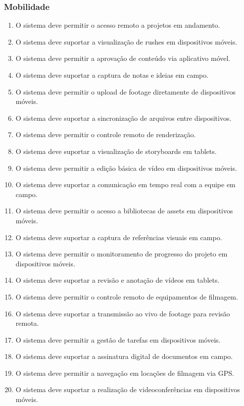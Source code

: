 \subsubsection{Mobilidade}
\begin{enumerate}
  \item O sistema deve permitir o acesso remoto a projetos em andamento.
  \item O sistema deve suportar a visualização de rushes em dispositivos móveis.
  \item O sistema deve permitir a aprovação de conteúdo via aplicativo móvel.
  \item O sistema deve suportar a captura de notas e ideias em campo.
  \item O sistema deve permitir o upload de footage diretamente de dispositivos móveis.
  \item O sistema deve suportar a sincronização de arquivos entre dispositivos.
  \item O sistema deve permitir o controle remoto de renderização.
  \item O sistema deve suportar a visualização de storyboards em tablets.
  \item O sistema deve permitir a edição básica de vídeo em dispositivos móveis.
  \item O sistema deve suportar a comunicação em tempo real com a equipe em campo.
  \item O sistema deve permitir o acesso a bibliotecas de assets em dispositivos móveis.
  \item O sistema deve suportar a captura de referências visuais em campo.
  \item O sistema deve permitir o monitoramento de progresso do projeto em dispositivos móveis.
  \item O sistema deve suportar a revisão e anotação de vídeos em tablets.
  \item O sistema deve permitir o controle remoto de equipamentos de filmagem.
  \item O sistema deve suportar a transmissão ao vivo de footage para revisão remota.
  \item O sistema deve permitir a gestão de tarefas em dispositivos móveis.
  \item O sistema deve suportar a assinatura digital de documentos em campo.
  \item O sistema deve permitir a navegação em locações de filmagem via GPS.
  \item O sistema deve suportar a realização de videoconferências em dispositivos móveis.
\end{enumerate}

